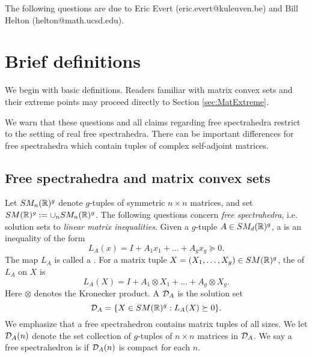 

The following questions are due to Eric Evert (eric.evert@kuleuven.be) and Bill Helton (helton@math.ucsd.edu).


\section{Brief definitions}

We begin with basic definitions. Readers familiar with matrix convex sets and their extreme points may proceed directly to Section 
\ref{sec:MatExtreme}.

We warn that these questions and all claims regarding free spectrahedra restrict to the setting of real free spectrahedra. There can be 
important differences for free spectrahedra which contain tuples of complex self-adjoint matrices. 

\subsection{Free spectrahedra and matrix convex sets}

Let $SM_n (\mathbb{R}) ^g$ denote $g$-tuples of symmetric $n \times n$ matrices, and set $SM (\mathbb{R})^g := \cup_n SM_n (\mathbb{R})^g$. The following questions 
concern \textit{free spectrahedra}, i.e. solution sets to \textit{linear matrix inequalities}. Given a $g$-tuple $A \in SM_d (\mathbb{R})^g$, a 
 is an inequality of the form 
\[
L_A (x) = I + A_1 x_1 + \dots + A_g x_g \succeq 0.
\]
The map $L_A$ is called a . For a matrix tuple $X = (X_1, \dots, X_g) \in SM(\mathbb{R})^g$, the  of $L_A$ on 
$X$ is 
\[
L_A (X) = I + A_1 \otimes X_1 + \dots + A_g \otimes X_g. 
\]
Here $\otimes$ denotes the Kronecker product. A  $\mathcal{D}_A$ is the solution set 
\[
\mathcal{D}_A = \{ X \in SM (\mathbb{R})^g : L_A (X) \succeq 0 \}.
\]
We emphasize that a free spectrahedron contains matrix tuples of all sizes. We let $\mathcal{D}_A (n)$ denote the set collection of $g$-tuples of $n 
\times n$ matrices in $\mathcal{D}_A$. We say a free spectrahedron is  if $\mathcal{D}_A (n)$ is compact for each $n$.

